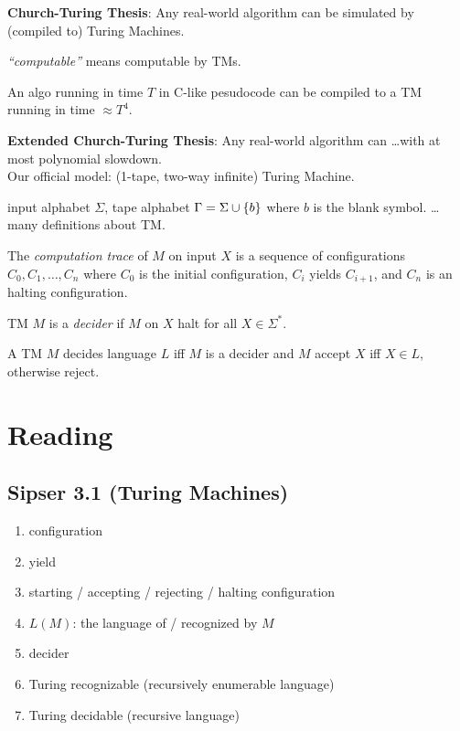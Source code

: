 \documentclass{article}
\begin{document}
\noindent
{\bf Church-Turing Thesis}: Any real-world algorithm can be simulated by (compiled to) Turing Machines.

\begin{definition}
  {\it ``computable''} means computable by TMs.
\end{definition}

\begin{fact}
  An algo running in time \(T\) in C-like pesudocode can be compiled to a TM running in time \(\approx T^4\).
\end{fact}

\noindent
{\bf Extended Church-Turing Thesis}: Any real-world algorithm can \ldots with at most polynomial slowdown. \\

Our official model: (1-tape, two-way infinite) Turing Machine.

input alphabet \(\Sigma\), tape alphabet \(\Gamma = \Sigma \cup \lbrace b\rbrace\) where \(b\) is the blank symbol. \ldots many definitions about TM.

\begin{definition}
  The {\it computation trace} of \(M\) on input \(X\) is a sequence of configurations \(C_0, C_1, \ldots, C_n\) where \(C_0\) is the initial configuration, \(C_i\) yields \(C_{i+1}\), and \(C_n\) is an halting configuration.
\end{definition}

\begin{definition}
  TM \(M\) is a {\it decider} if \(M\) on \(X\) halt for all \(X \in \Sigma^*\).
\end{definition}

\begin{definition}
  A TM \(M\) decides language \(L\) iff \(M\) is a decider and \(M\) accept \(X\) iff \(X \in L\), otherwise reject.
\end{definition}

\section{Reading}

\subsection{Sipser 3.1 (Turing Machines)}

\begin{enumerate}
  \item configuration
  \item yield
  \item starting / accepting / rejecting / halting configuration
  \item \(L(M)\): the language of / recognized by \(M\)
  \item decider
  \item Turing recognizable (recursively enumerable language)
  \item Turing decidable (recursive language)
\end{enumerate}
\end{document}
